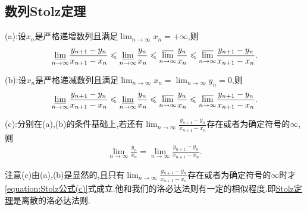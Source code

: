 \documentclass[lang=cn,newtx,10pt,scheme=chinese]{elegantbook}
\begin{document}
\subsection{数列Stolz定理}

\begin{theorem}[Stolz定理]\label{theorem:Stolz定理}
(a):设\(x_n\)是严格递增数列且满足\(\lim_{n \to \infty} x_n = +\infty\),则
\begin{align*}
   \underset{n\rightarrow \infty}{{\varliminf }} \frac{y_{n + 1} - y_n}{x_{n + 1} - x_n} \leqslant \underset{n\rightarrow \infty}{{\varliminf }} \frac{y_n}{x_n} \leqslant \underset{n\rightarrow \infty}{{\varlimsup }} \frac{y_n}{x_n} \leqslant \underset{n\rightarrow \infty}{{\varlimsup }} \frac{y_{n + 1} - y_n}{x_{n + 1} - x_n}.
\end{align*}

(b):设\(x_n\)是严格递减数列且满足\(\lim_{n \to \infty} x_n = \lim_{n \to \infty} y_n = 0\),则
\begin{align*}
   \underset{n\rightarrow \infty}{{\varliminf }} \frac{y_{n + 1} - y_n}{x_{n + 1} - x_n} \leqslant \underset{n\rightarrow \infty}{{\varliminf }} \frac{y_n}{x_n} \leqslant \underset{n\rightarrow \infty}{{\varlimsup }} \frac{y_n}{x_n} \leqslant \underset{n\rightarrow \infty}{{\varlimsup }} \frac{y_{n + 1} - y_n}{x_{n + 1} - x_n}.
\end{align*}

(c):分别在(a),(b)的条件基础上,若还有\(\lim_{n \to \infty} \frac{y_{n + 1} - y_n}{x_{n + 1} - x_n}\)存在或者为确定符号的\(\infty\),则
\begin{align}\label{equation:Stolz公式(c)}
  \lim_{n \to \infty} \frac{y_n}{x_n} = \lim_{n \to \infty} \frac{y_{n + 1} - y_n}{x_{n + 1} - x_n} .
\end{align}
\end{theorem}
\begin{remark}
注意(c)由(a),(b)是显然的,且只有\(\lim_{n \to \infty} \frac{y_{n + 1} - y_n}{x_{n + 1} - x_n}\)存在或者为确定符号的\(\infty\)时才\eqref{equation:Stolz公式(c)}式成立.他和我们的洛必达法则有一定的相似程度.即\hyperref[theorem:Stolz定理]{Stolz定理}是离散的洛必达法则.
\end{remark}
\end{document}
